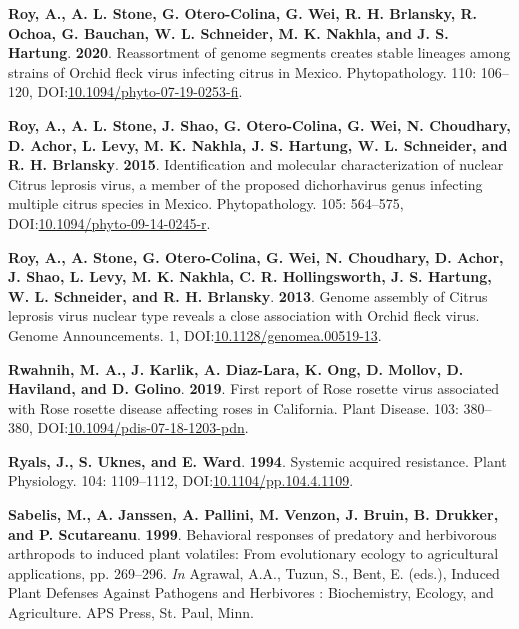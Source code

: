 \documentclass[12pt,final,CPage]{ufthesis}
\newlength{\cslhangindent}
\newenvironment{CSLReferences}[2] %
{%
	\setlength{\parindent}{0pt}
	\ifodd #1 \everypar{\setlength{\hangindent}{\cslhangindent}}\ignorespaces\fi
	\ifnum #2 > 0
	\setlength{\parskip}{#2\baselineskip}
	\fi
}%
{}
\begin{document}
{\begin{CSLReferences}{1}{0}
  \leavevmode{}%
  \textbf{Roy, A., A. L. Stone, G. Otero-Colina, G. Wei, R. H. Brlansky, R. Ochoa, G. Bauchan, W. L. Schneider, M. K. Nakhla, and J. S. Hartung}. \textbf{2020}. Reassortment of genome segments creates stable lineages among strains of {Orchid fleck virus} infecting citrus in {Mexico}. Phytopathology{\textregistered}. 110: 106--120, DOI:\href{https://doi.org/10.1094/phyto-07-19-0253-fi}{10.1094/phyto-07-19-0253-fi}.

  \leavevmode{}%
  \textbf{Roy, A., A. L. Stone, J. Shao, G. Otero-Colina, G. Wei, N. Choudhary, D. Achor, L. Levy, M. K. Nakhla, J. S. Hartung, W. L. Schneider, and R. H. Brlansky}. \textbf{2015}. Identification and molecular characterization of nuclear {Citrus leprosis virus}, a member of the proposed dichorhavirus genus infecting multiple citrus species in {Mexico}. Phytopathology{\textregistered}. 105: 564--575, DOI:\href{https://doi.org/10.1094/phyto-09-14-0245-r}{10.1094/phyto-09-14-0245-r}.

  \leavevmode{}%
  \textbf{Roy, A., A. Stone, G. Otero-Colina, G. Wei, N. Choudhary, D. Achor, J. Shao, L. Levy, M. K. Nakhla, C. R. Hollingsworth, J. S. Hartung, W. L. Schneider, and R. H. Brlansky}. \textbf{2013}. Genome assembly of {Citrus leprosis virus} nuclear type reveals a close association with {Orchid fleck virus}. Genome Announcements. 1, DOI:\href{https://doi.org/10.1128/genomea.00519-13}{10.1128/genomea.00519-13}.

  \leavevmode{}%
  \textbf{Rwahnih, M. A., J. Karlik, A. Diaz-Lara, K. Ong, D. Mollov, D. Haviland, and D. Golino}. \textbf{2019}. First report of {Rose rosette virus} associated with {Rose rosette disease} affecting roses in {California}. Plant Disease. 103: 380--380, DOI:\href{https://doi.org/10.1094/pdis-07-18-1203-pdn}{10.1094/pdis-07-18-1203-pdn}.

  \leavevmode{}%
  \textbf{Ryals, J., S. Uknes, and E. Ward}. \textbf{1994}. Systemic acquired resistance. Plant Physiology. 104: 1109--1112, DOI:\href{https://doi.org/10.1104/pp.104.4.1109}{10.1104/pp.104.4.1109}.

  \leavevmode{}%
  \textbf{Sabelis, M., A. Janssen, A. Pallini, M. Venzon, J. Bruin, B. Drukker, and P. Scutareanu}. \textbf{1999}. Behavioral responses of predatory and herbivorous arthropods to induced plant volatiles: From evolutionary ecology to agricultural applications, pp. 269--296. \emph{In} Agrawal, A.A., Tuzun, S., Bent, E. (eds.), Induced Plant Defenses Against Pathogens and Herbivores : Biochemistry, Ecology, and Agriculture. APS Press, St. Paul, Minn.


\end{CSLReferences}}
\end{document}
